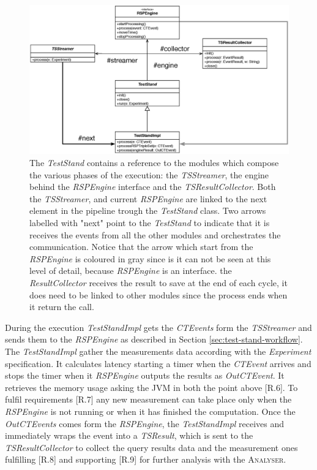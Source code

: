 \begin{figure}[tbh]
  \centering
	\includegraphics[width=0.90\linewidth]{images/uml_teststand_modules}
	\caption[\name \textsc{TestStand} and Modules  - UML Schema] { The \textit{TestStand} contains a reference to the modules which compose the various phases of the execution: the \textit{TSStreamer}, the engine behind the \textit{RSPEngine} interface and the \textit{TSResultCollector}. Both the \textit{TSStreamer}, and current \textit{RSPEngine} are linked to the next element in the pipeline trough the \textit{TestStand} class. Two arrows labelled with "next"  point to the  \textit{TestStand} to indicate that it is receives the events from all the other modules and orchestrates the communication. Notice that the arrow which start from the \textit{RSPEngine} is coloured in gray since is it can not be seen at this level of detail, because \textit{RSPEngine} is an interface.  the \textit{ResultCollector} receives the result to save at the end of each cycle, it does need to be linked to other modules since the process ends when it return the call.} 
  	\label{fig:uml_teststand_modules}
\end{figure}

During the execution \textit{TestStandImpl} gets the \textit{CTEvents} form the \textit{TSStreamer} and sends them to the \textit{RSPEngine} as described in Section \ref{sec:test-stand-workflow}. The \textit{TestStandImpl} gather the measurements data according with the \textit{Experiment} specification. It calculates latency starting a timer when the \textit{CTEvent} arrives and stops the timer when it \textit{RSPEngine} outputs the results as \textit{OutCTEvent}. It retrieves the memory usage asking the JVM in both the point above [R.6]. To fulfil requirements [R.7] any new measurement can take place only when the \textit{RSPEngine} is not running or when it has finished the computation. Once the \textit{OutCTEvents} comes form the \textit{RSPEngine}, the \textit{TestStandImpl} receives and immediately wraps the event into a \textit{TSResult}, which is sent to the \textit{TSResultCollector} to collect the query results data and the measurement ones fulfilling [R.8] and supporting [R.9] for further analysis with the \textsc{Analyser}.
%

